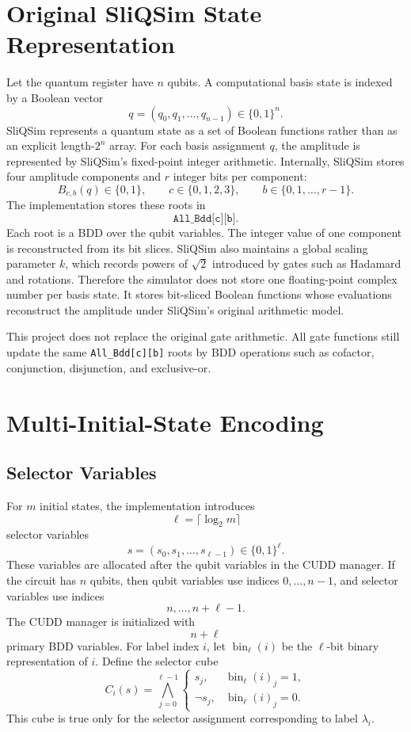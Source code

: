 \documentclass[sigconf,nonacm]{acmart}
\begin{document}
\section{Original SliQSim State Representation}
Let the quantum register have $n$ qubits. A computational basis state is indexed by a Boolean vector
\[
  q=(q_0,q_1,\ldots,q_{n-1})\in\{0,1\}^n.
\]
SliQSim represents a quantum state as a set of Boolean functions rather than as an explicit length-$2^n$ array. For each basis assignment $q$, the amplitude is represented by SliQSim's fixed-point integer arithmetic. Internally, SliQSim stores four amplitude components and $r$ integer bits per component:
\[
  B_{c,b}(q)\in\{0,1\},
  \qquad
  c\in\{0,1,2,3\},
  \qquad
  b\in\{0,1,\ldots,r-1\}.
\]
The implementation stores these roots in
\[
  \texttt{All\_Bdd[c][b]}.
\]
Each root is a BDD over the qubit variables. The integer value of one component is reconstructed from its bit slices. SliQSim also maintains a global scaling parameter $k$, which records powers of $\sqrt{2}$ introduced by gates such as Hadamard and rotations. Therefore the simulator does not store one floating-point complex number per basis state. It stores bit-sliced Boolean functions whose evaluations reconstruct the amplitude under SliQSim's original arithmetic model.

This project does not replace the original gate arithmetic. All gate functions still update the same \texttt{All\_Bdd[c][b]} roots by BDD operations such as cofactor, conjunction, disjunction, and exclusive-or.

\section{Multi-Initial-State Encoding}
\subsection{Selector Variables}
For $m$ initial states, the implementation introduces
\[
  \ell=\lceil \log_2 m\rceil
\]
selector variables
\[
  s=(s_0,s_1,\ldots,s_{\ell-1})\in\{0,1\}^{\ell}.
\]
These variables are allocated after the qubit variables in the CUDD manager. If the circuit has $n$ qubits, then qubit variables use indices $0,\ldots,n-1$, and selector variables use indices
\[
  n,\ldots,n+\ell-1.
\]
The CUDD manager is initialized with
\[
  n+\ell
\]
primary BDD variables. For label index $i$, let $\operatorname{bin}_{\ell}(i)$ be the $\ell$-bit binary representation of $i$. Define the selector cube
\[
  C_i(s)=
  \bigwedge_{j=0}^{\ell-1}
  \begin{cases}
    s_j, & \operatorname{bin}_{\ell}(i)_j=1,\\
    \neg s_j, & \operatorname{bin}_{\ell}(i)_j=0.
  \end{cases}
\]
This cube is true only for the selector assignment corresponding to label $\lambda_i$.
\end{document}
